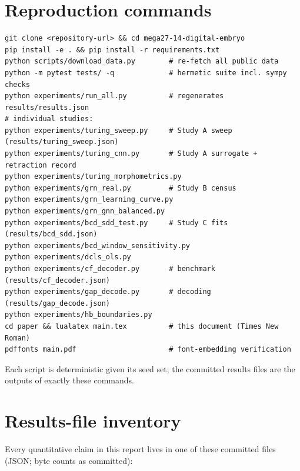\section{Reproduction commands}
\label{app:repro}

\begin{verbatim}
git clone <repository-url> && cd mega27-14-digital-embryo
pip install -e . && pip install -r requirements.txt
python scripts/download_data.py        # re-fetch all public data
python -m pytest tests/ -q             # hermetic suite incl. sympy checks
python experiments/run_all.py          # regenerates results/results.json
# individual studies:
python experiments/turing_sweep.py     # Study A sweep (results/turing_sweep.json)
python experiments/turing_cnn.py       # Study A surrogate + retraction record
python experiments/turing_morphometrics.py
python experiments/grn_real.py         # Study B census
python experiments/grn_learning_curve.py
python experiments/grn_gnn_balanced.py
python experiments/bcd_sdd_test.py     # Study C fits (results/bcd_sdd.json)
python experiments/bcd_window_sensitivity.py
python experiments/dcls_ols.py
python experiments/cf_decoder.py       # benchmark (results/cf_decoder.json)
python experiments/gap_decode.py       # decoding (results/gap_decode.json)
python experiments/hb_boundaries.py
cd paper && lualatex main.tex          # this document (Times New Roman)
pdffonts main.pdf                      # font-embedding verification
\end{verbatim}

Each script is deterministic given its seed set; the committed results files
are the outputs of exactly these commands.

\section{Results-file inventory}
\label{app:results}

Every quantitative claim in this report lives in one of these committed files
(JSON; byte counts as committed):

